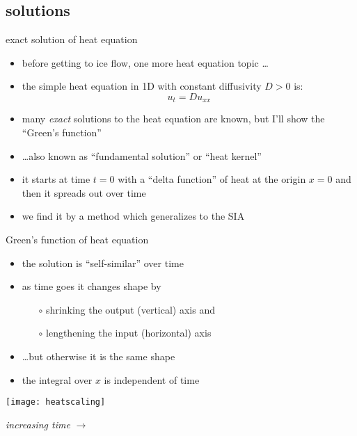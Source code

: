 \subsection{solutions}

\begin{frame}{exact solution of heat equation}

\begin{itemize}
\item before getting to ice flow, one more heat equation topic \dots
\item the simple heat equation in 1D with constant diffusivity $D>0$ is:
	$$u_t = D u_{xx}$$
\item many \emph{exact} solutions to the heat equation are known, but I'll show the ``Green's function''
\item \dots also known as ``fundamental solution'' or ``heat kernel''
\item it starts at time $t=0$ with a ``delta function'' of heat at the origin $x=0$ and then it spreads out over time
\item we find it by a method which generalizes to the SIA
\end{itemize}
\end{frame}


\begin{frame}{Green's function of heat equation}

\begin{itemize}
\item the solution is ``self-similar'' over time
\item as time goes it changes shape by
  \begin{itemize}
  \item[$\circ$] shrinking the output (vertical) axis and
  \item[$\circ$] lengthening the input (horizontal) axis
  \end{itemize}
\item \dots but otherwise it is the same shape
\item the integral over $x$ is independent of time
\end{itemize}

\begin{center}
\texttt{[image: heatscaling]}

\emph{increasing time} \Large $\to$
\end{center}
\end{frame}


